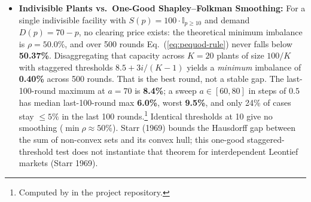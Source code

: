 \documentclass[10pt,twoside,openany]{book}
\theoremstyle{dpepstyle}
\begin{document}
\begin{itemize}[leftmargin=1.6em,itemsep=2pt]
  The cause is the income feedback, not the complementarity of the goods. In a control run with the same Leontief consumers, starting prices, and price rule, but with each budget fixed at one third of the value of total supply (so relative incomes do not move with relative prices), the same rule reaches 5\% in round~9 and stays below \textbf{0.02\%}. This agrees with Cheung, Cole, and Devanur (2020), who show that t\^atonnement converges in Fisher markets (fixed budgets) with Leontief and all complementary CES utilities, because it is then a form of gradient descent on a convex program.\footnote{Cheung, Cole, and Devanur 2020 (conference version STOC 2013). The result covers multiplicative t\^atonnement with suitably bounded steps, not Eq.~(\ref{eq:pequod-rule}) specifically.} Parecon incomes are set by effort, not by ownership, so Scarf's mechanism does not carry over directly. The relevant risk for DPEP is narrower: budgets depend on prices and plans through the effort cap ($SB_j/SC_j$ in Eq.~\ref{eq:effort-cap}), credited hours and CAP compensation (Eq.~\ref{eq:warranted-budget}). Whether that feedback is strong enough to cause cycling is untested; it is the endogenous-income question that Algorithm~3d and open question P2 address. Scarf's economy is therefore kept as a stress test of income feedback, not as evidence that complementary goods defeat council iteration.
  \item \textbf{Indivisible Plants vs.\ One-Good Shapley--Folkman Smoothing:} For a single indivisible facility with $S(p) = 100 \cdot \mathbb{I}_{p \ge 10}$ and demand $D(p) = 70 - p$, no clearing price exists: the theoretical minimum imbalance is $\rho = 50.0\%$, and over 500 rounds Eq.~(\ref{eq:pequod-rule}) never falls below \textbf{50.37\%}. Disaggregating that capacity across $K=20$ plants of size $100/K$ with staggered thresholds $8.5+3i/(K-1)$ yields a \emph{minimum} imbalance of \textbf{0.40\%} across 500 rounds. That is the best round, not a stable gap. The last-100-round maximum at $a=70$ is \textbf{8.4\%}; a sweep $a\in[60,80]$ in steps of $0.5$ has median last-100-round max \textbf{6.0\%}, worst \textbf{9.5\%}, and only 24\% of cases stay $\le 5\%$ in the last 100 rounds.\footnote{Computed by  in the project repository.} Identical thresholds at 10 give no smoothing ($\min\rho\approx 50\%$). Starr (1969) bounds the Hausdorff gap between the sum of non-convex sets and its convex hull; this one-good staggered-threshold test does not instantiate that theorem for interdependent Leontief markets (Starr 1969).
\end{itemize}
\end{document}
